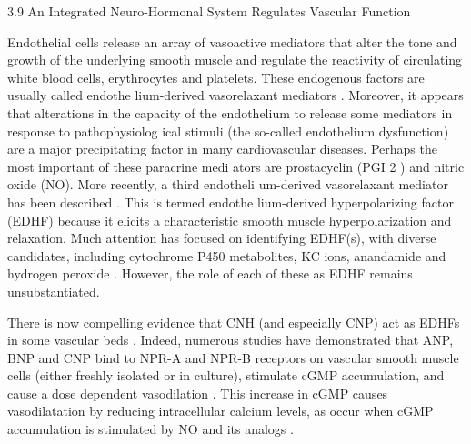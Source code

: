 \documentclass[14pt,a4paper,onecolumn]{extarticle}
\begin{document}
3.9 An Integrated Neuro-Hormonal System Regulates Vascular Function

Endothelial cells release an array of vasoactive mediators that alter the tone and growth of the underlying smooth muscle and regulate the reactivity of circulating white blood cells, erythrocytes and platelets. These endogenous factors are usually called endothe lium-derived vasorelaxant mediators \citep{267}. Moreover, it appears that alterations in the capacity of the endothelium to release some mediators in response to pathophysiolog ical stimuli (the so-called endothelium dysfunction) are a major precipitating factor in many cardiovascular diseases. Perhaps the most important of these paracrine medi ators are prostacyclin (PGI 2 ) and nitric oxide (NO). More recently, a third endotheli um-derived vasorelaxant mediator has been described \citep{267}. This is termed endothe lium-derived hyperpolarizing factor (EDHF) because it elicits a characteristic smooth muscle hyperpolarization and relaxation. Much attention has focused on identifying EDHF(s), with diverse candidates, including cytochrome P450 metabolites, KC ions, anandamide and hydrogen peroxide \citep{267}. However, the role of each of these as EDHF remains unsubstantiated.

There is now compelling evidence that CNH (and especially CNP) act as EDHFs in some vascular beds \citep{267-271}. Indeed, numerous studies have demonstrated that ANP, BNP and CNP bind to NPR-A and NPR-B receptors on vascular smooth muscle cells (either freshly isolated or in culture), stimulate cGMP accumulation, and cause a dose dependent vasodilation \citep{268-271}. This increase in cGMP causes vasodilatation by reducing intracellular calcium levels, as occur when cGMP accumulation is stimulated by NO and its analogs \citep{268}.
\end{document}
